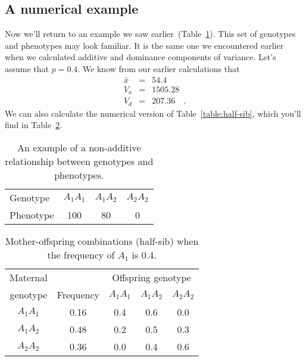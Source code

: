 \documentclass[12pt]{article}
\begin{document}
\subsection*{A numerical example}

Now we'll return to an example we saw
earlier~(Table~\ref{table:example}). This set of genotypes and
phenotypes may look familiar. It is the same one we encountered
earlier when we calculated additive and dominance components of
variance. Let's assume that $p = 0.4$. We know from our earlier
calculations that
\begin{eqnarray*}
\bar x &=& 54.4 \\
V_a &=& 1505.28 \\
V_d &=& 207.36 \quad .
\end{eqnarray*}
We can also calculate the numerical version of
Table~\ref{table:half-sib}, which you'll find in
Table~\ref{table:example-hs}.

\begin{table}
\begin{center}
\begin{tabular}{l|ccc}
\hline\hline
Genotype  & $A_1A_1$ & $A_1A_2$ & $A_2A_2$ \\
Phenotype & 100        & 80      & 0 \\
\hline
\end{tabular}
\end{center}
\caption{An example of a non-additive relationship between genotypes
  and phenotypes.}\label{table:example}
\end{table}

\begin{table}
\begin{center}
\begin{tabular}{c|c|ccc}
\hline\hline
Maternal &           & \multicolumn{3}{c}{Offspring genotype} \\
genotype & Frequency & $A_1A_1$ & $A_1A_2$ & $A_2A_2$ \\
\hline
$A_1A_1$ & 0.16      & 0.4      & 0.6      & 0.0 \\
$A_1A_2$ & 0.48      & 0.2      & 0.5      & 0.3 \\
$A_2A_2$ & 0.36      & 0.0      & 0.4      & 0.6 \\
\hline
\end{tabular}
\end{center}
\caption{Mother-offspring combinations (half-sib) when the frequency
  of $A_1$ is 0.4.}\label{table:example-hs}
\end{table}
\end{document}
